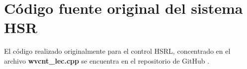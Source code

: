 \chapter{Código fuente original del sistema HSR}
\label{anexo:hsrlnies}

El código realizado originalmente para el control HSRL, concentrado en el archivo \textbf{wvcnt\_lec.cpp} se encuentra en el repositorio de GitHub \cite{repo}.